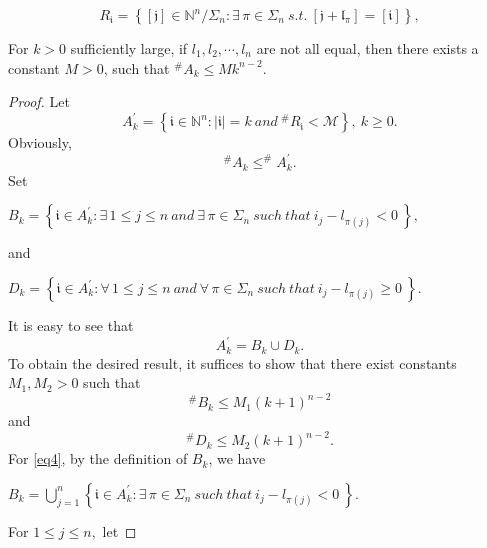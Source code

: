 \documentclass[10pt,a4paper]{amsart}
\begin{document}
\begin{equation}\label{eq2}
R_{\mathfrak{i}}=\left\{[\mathfrak{j}]\in\mathbb N^n/\Sigma_n:  \exists \, \pi \in \Sigma_{n}~s.t.~  [\mathfrak{j}+\mathfrak{l}_\pi]=[\mathfrak{i}]\right\},
\end{equation}

\begin{lem}\label{lemmas2.2}
    For $k>0$ sufficiently large, if $l_{1},  l_{2},\cdots,l_{n}$ are not all equal, then there exists a constant $M>0$, such that $^{\#  } A_{k} \le Mk^{n-2}$.
\end{lem}

\begin{proof}
Let \begin{equation}\label{eq31001}A_{k}^{\prime}=\left \{  \mathfrak{i} \in \mathbb{N}^n: | \mathfrak{i}  |=k \ and \ ^{\#  }	R_{\mathfrak{i}  } <\mathscr{M}    \right \},~ k \geq 0.\end{equation}
Obviously,  $$^{\#  }A_{k} \leq ^{\#  }A_{k}^{\prime}.$$
	Set
	\begin{center}
		$B_{k}=\left \{  \mathfrak{i}  \in A_{k}^{\prime}:\exists \, 1\le j\le n \  and \  \exists \, \pi \in \Sigma_{n} \ such \  that \  i_{j}-l_{\pi(j)}<0  \   \right \},$
	\end{center}
	and
	\begin{center}
		$D_{k}=\left \{  \mathfrak{i} \in A_{k}^{\prime}:\forall \, 1\le j\le n \  and \  \forall \, \pi \in \Sigma_{n} \ such \  that \  i_{j}-l_{\pi(j)}\ge 0  \   \right \}.$
	\end{center}
	It is easy to see that \begin{equation}\label{eq4151}A_{k}^{\prime} = B_{k}\cup D_{k}.\end{equation}
To obtain the desired result, it suffices to show that there exist constants $M_1,M_2>0$ such that
	\begin{equation}\label{eq4}
		^{\#  } B_{k} \le M_{1}\left ( k+1 \right ) ^{n-2}
	\end{equation}
and 
	\begin{equation}\label{eq5}
		^{\#  } D_{k}  \le  M_{2} \left ( k+1 \right ) ^{n-2}.
	\end{equation}
For \eqref{eq4}, by the definition of $B_{k}$, we have
	\begin{center}
		$B_{k}=\bigcup\limits_{j=1}^{n} \left \{ \mathfrak{i}  \in A_{k}^{\prime}:\exists \, \pi \in \Sigma_{n} \ such \  that \  i_{j}-l_{\pi(j)}<0  \   \right \}.$
	\end{center}
For $ 1 \le j \le n,$	let
	

\end{proof}
\end{document}
